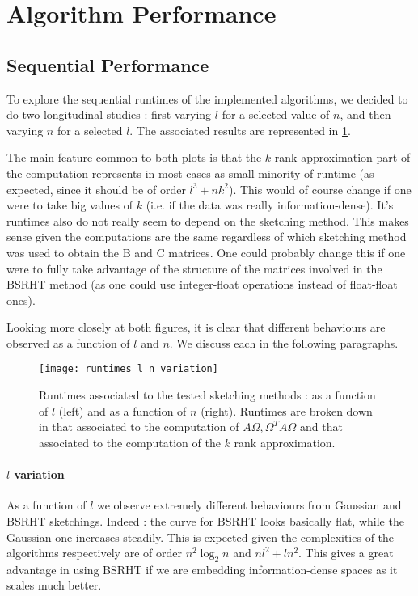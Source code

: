 \documentclass[a4paper, 12pt,oneside]{article}
\begin{document}
	\section{Algorithm Performance}
        \subsection{Sequential Performance}
		To explore the sequential runtimes of the implemented algorithms, we decided to do two longitudinal studies : first varying $l$ for a selected value of $n$, and then varying $n$ for a selected $l$. The associated results are represented in \ref{fig:runtimes-l-n-variation}. 

		The main feature common to both plots is that the $k$ rank approximation part of the computation represents in most cases as small minority of runtime (as expected, since it should be of order $l^3 +nk^2$). This would of course change if one were to take big values of $k$ (i.e. if the data was really information-dense).  	
		It's runtimes also do not really seem to depend on the sketching method. This makes sense given the computations are the same regardless of which sketching method was used to obtain the B and C matrices. One could probably change this if one were to fully take advantage of the structure of the matrices involved in the BSRHT method (as one could use integer-float operations instead of float-float ones). 

		Looking more closely at both figures, it is clear that different behaviours are observed as a function of $l$ and $n$. We discuss each in the following paragraphs.
		\begin{figure}[htb]       
			\centering             
				\vspace{0em}
				\texttt{[image: runtimes\_l\_n\_variation]}
				\caption{Runtimes associated to the tested sketching methods : as a function of $l$ (left) and as a function of $n$ (right). Runtimes are broken down in that associated to the computation of $A\Omega,\Omega^T A\Omega$ and that associated to the computation of the $k$ rank approximation.}
				\label{fig:runtimes-l-n-variation}
		\end{figure}
		\paragraph{$l$ variation}
		As a function of $l$ we observe extremely different behaviours from Gaussian and BSRHT sketchings. Indeed : the curve for BSRHT looks basically flat, while the Gaussian one increases steadily. This is expected given the complexities of the algorithms respectively are of order $n^2\log_2{n}$ and $nl^2 + ln^2$. This gives a great advantage in using BSRHT if we are embedding information-dense spaces as it scales much better.		
\end{document}
